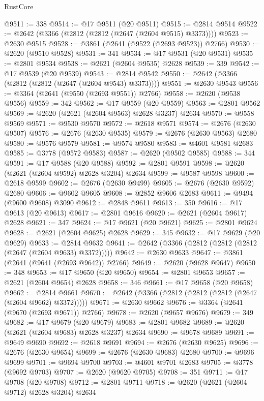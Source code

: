 \begin{lexlean}{RustCore}
\begin{coremodule}
@9511 := 338
@9514 := @17 @9511 (@20 @9511)
@9515 := @2814 @9514
@9522 := @2642 (@3366 (@2812 (@2812 (@2647 (@2604 @9515) @3373))))
@9523 := @2630 @9515
@9528 := @3861 (@2641 (@9522 (@2693 @9523)) @2766)
@9530 := @2620 (@9510 @9528)
@9531 := 341
@9534 := @17 @9531 (@20 @9531)
@9535 := @2801 @9534
@9538 := @2621 (@2604 @9535) @2628
@9539 := 339
@9542 := @17 @9539 (@20 @9539)
@9543 := @2814 @9542
@9550 := @2642 (@3366 (@2812 (@2812 (@2647 (@2604 @9543) @3373))))
@9551 := @2630 @9543
@9556 := @3364 (@2641 (@9550 (@2693 @9551)) @2766)
@9558 := @2620 (@9538 @9556)
@9559 := 342
@9562 := @17 @9559 (@20 @9559)
@9563 := @2801 @9562
@9569 := @2620 (@2621 (@2604 @9563) @2628 @3237) @2634
@9570 := @9558 @9569
@9571 := @9530 @9570
@9572 := @2618 @9571
@9574 := @2676 (@2630 @9507)
@9576 := @2676 (@2630 @9535)
@9579 := @2676 (@2630 @9563) @2680
@9580 := @9576 @9579
@9581 := @9574 @9580
@9583 := @4601 @9581 @2683
@9585 := @3778 (@9572 @9583)
@9587 := @2620 (@9502 @9585)
@9588 := 344
@9591 := @17 @9588 (@20 @9588)
@9592 := @2801 @9591
@9598 := @2620 (@2621 (@2604 @9592) @2628 @3204) @2634
@9599 := @9587 @9598
@9600 := @2618 @9599
@9602 := @2676 (@2630 @9499)
@9605 := @2676 (@2630 @9592) @2680
@9606 := @9602 @9605
@9608 := @2852 @9606 @2683
@9611 := @9494 (@9600 @9608) @3090
@9612 := @2848 @9611
@9613 := 350
@9616 := @17 @9613 (@20 @9613)
@9617 := @2801 @9616
@9620 := @2621 (@2604 @9617) @2628
@9621 := 347
@9624 := @17 @9621 (@20 @9621)
@9625 := @2801 @9624
@9628 := @2621 (@2604 @9625) @2628
@9629 := 345
@9632 := @17 @9629 (@20 @9629)
@9633 := @2814 @9632
@9641 := @2642 (@3366 (@2812 (@2812 (@2812 (@2647 (@2604 @9633) @3372)))))
@9642 := @2630 @9633
@9647 := @3861 (@2641 (@9641 (@2693 @9642)) @2766)
@9649 := @2620 (@9628 @9647)
@9650 := 348
@9653 := @17 @9650 (@20 @9650)
@9654 := @2801 @9653
@9657 := @2621 (@2604 @9654) @2628
@9658 := 346
@9661 := @17 @9658 (@20 @9658)
@9662 := @2814 @9661
@9670 := @2642 (@3366 (@2812 (@2812 (@2812 (@2647 (@2604 @9662) @3372)))))
@9671 := @2630 @9662
@9676 := @3364 (@2641 (@9670 (@2693 @9671)) @2766)
@9678 := @2620 (@9657 @9676)
@9679 := 349
@9682 := @17 @9679 (@20 @9679)
@9683 := @2801 @9682
@9689 := @2620 (@2621 (@2604 @9683) @2628 @3237) @2634
@9690 := @9678 @9689
@9691 := @9649 @9690
@9692 := @2618 @9691
@9694 := @2676 (@2630 @9625)
@9696 := @2676 (@2630 @9654)
@9699 := @2676 (@2630 @9683) @2680
@9700 := @9696 @9699
@9701 := @9694 @9700
@9703 := @4601 @9701 @2683
@9705 := @3778 (@9692 @9703)
@9707 := @2620 (@9620 @9705)
@9708 := 351
@9711 := @17 @9708 (@20 @9708)
@9712 := @2801 @9711
@9718 := @2620 (@2621 (@2604 @9712) @2628 @3204) @2634

\end{coremodule}
\end{lexlean}
